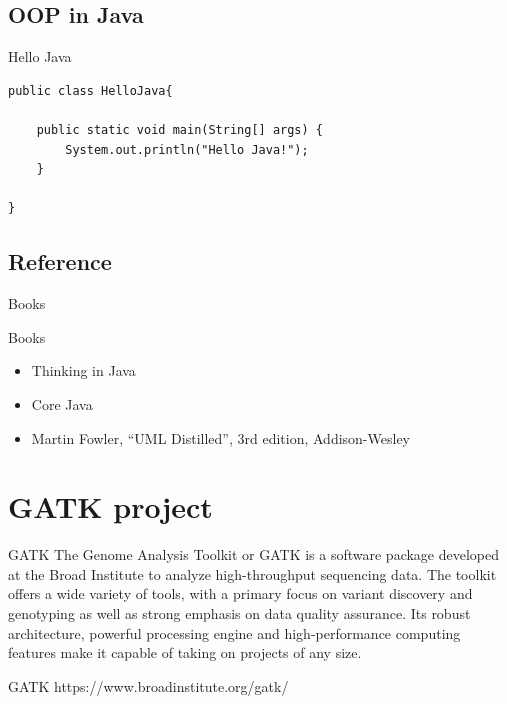\documentclass[UTF8]{beamer}
\begin{document}
\subsection{OOP in Java}

\begin{frame}[fragile]{Hello Java}
\begin{verbatim}
public class HelloJava{

    public static void main(String[] args) {
        System.out.println("Hello Java!");
    }

}
\end{verbatim}
\end{frame}


\subsection{Reference}

\begin{frame}[t]{Books}
  \begin{block}{Books}
    \begin{itemize}
      \item Thinking in Java
      \item Core Java
      \item Martin Fowler, ``UML Distilled'', 3rd edition, Addison-Wesley
    \end{itemize}
  \end{block}
\end{frame}



\section{GATK project}

\begin{frame}[t]{GATK}
  The Genome Analysis Toolkit or GATK is a software package developed at the
  Broad Institute to analyze high-throughput sequencing data. The toolkit offers
   a wide variety of tools, with a primary focus on variant discovery and
    genotyping as well as strong emphasis on data quality assurance. Its robust
     architecture, powerful processing engine and high-performance computing
    features make it capable of taking on projects of any size.
\end{frame}

\begin{frame}[t]{GATK}
https://www.broadinstitute.org/gatk/
\end{frame}
\end{document}
